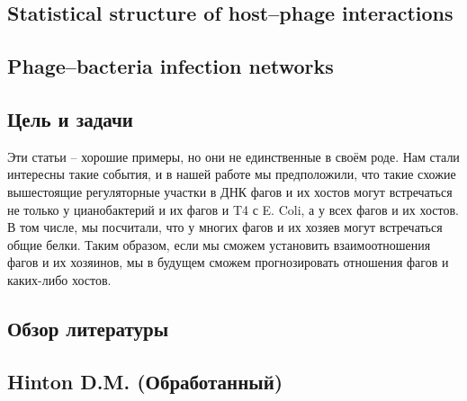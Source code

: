 \documentclass[14pt]{extarticle}
\begin{document}
    
\begin{center}
   \item \subsection{Statistical structure of host–phage interactions \cite{structure}}
\end{center}
    

   
\begin{center}
   \item \subsection{Phage–bacteria infection networks \cite{networks}}
\end{center}

    
\newpage
\begin{center}
\item \section{Цель и задачи} \label{sec:code}
\end{center}

\par{Эти статьи – хорошие примеры, но они не единственные в своём роде. Нам стали интересны такие события, и в нашей
    работе мы предположили, что такие схожие вышестоящие регуляторные участки в ДНК фагов и их хостов могут встречаться
    не только у цианобактерий и их фагов и T4 с E. Coli, а у всех фагов и их хостов. В том числе, мы посчитали, что у
    многих фагов и их хозяев могут встречаться общие белки. Таким образом, если мы сможем установить взаимоотношения
    фагов и их хозяинов, мы в будущем сможем прогнозировать отношения фагов и каких-либо хостов.}

\newpage
\begin{center}
\item \section{Обзор литературы} \label{sec:math}
\item \subsection{Hinton D.M. (Обработанный)}
\end{center}
        
\end{document}
